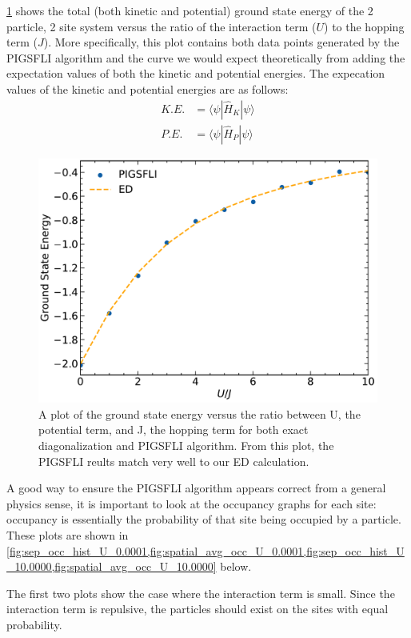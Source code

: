 \cref*{fig:total_energy} shows the total (both kinetic and potential) ground state energy of the 2 particle, 2 site system versus the ratio of the interaction term ($U$) to the hopping term ($J$). More specifically, this plot contains both data points generated by the PIGSFLI algorithm and the curve we would expect theoretically from adding the expectation values of both the kinetic and potential energies. The expecation values of the kinetic and potential energies are as follows: 
\begin{align*}
    K.E. &= \langle \psi | \hat{H}_K | \psi \rangle \\
    P.E. &= \langle \psi | \hat{H}_P | \psi \rangle
\end{align*}
\begin{figure}[H]
\centering
\includegraphics[scale=0.5]{../figures/total_energy.pdf}
\caption{A plot of the ground state energy versus the ratio between U, the potential term, and J, the hopping term for both exact diagonalization and PIGSFLI algorithm. From this plot, the PIGSFLI reults match very well to our ED calculation.}
\label{fig:total_energy}
\end{figure}

A good way to ensure the PIGSFLI algorithm appears correct from a general physics sense, it is important to look at the occupancy graphs for each site: occupancy is essentially the probability of that site being occupied by a particle. These plots are shown in \cref{fig:sep_occ_hist_U_0.0001,fig:spatial_avg_occ_U_0.0001,fig:sep_occ_hist_U_10.0000,fig:spatial_avg_occ_U_10.0000} below. 

The first two plots show the case where the interaction term is small. Since the interaction term is repulsive, the particles should exist on the sites with equal probability.

